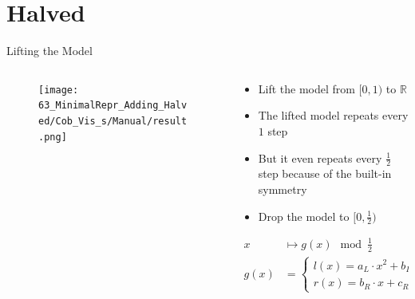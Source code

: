 \section{Halved}

\begin{frame}{Lifting the Model}
	\vspace{-1em}
	\begin{columns}
		\begin{column}{.4 \textwidth}
			\begin{figure}
				\texttt{[image: 63\_MinimalRepr\_Adding\_Halved/Cob\_Vis\_s/Manual/result.png]}
			\end{figure}
		\end{column}
		\begin{column}{.5 \textwidth}
			\pause
			\begin{itemize}
				\item Lift the model from $[0, 1)$ to $\mathbb{R}$ \pause
				\item The lifted model repeats every $1$ step \pause
				\item But it even repeats every $\frac{1}{2}$ step because of the built-in symmetry \pause
				\item Drop the model to $[0, \frac{1}{2})$ \pause
			\end{itemize}
			\begin{align*}
				x    & \mapsto g(x) \mod \frac{1}{2}                                            \\
				g(x) & = \begin{cases}
					         l(x) = a_L \cdot x^2 + b_L \cdot x + c_L & \text{ if } x < \frac{1}{4} \\
					         r(x) = b_R \cdot x + c_R                 & \text{ else}
				         \end{cases}
			\end{align*}
		\end{column}
	\end{columns}
\end{frame}


